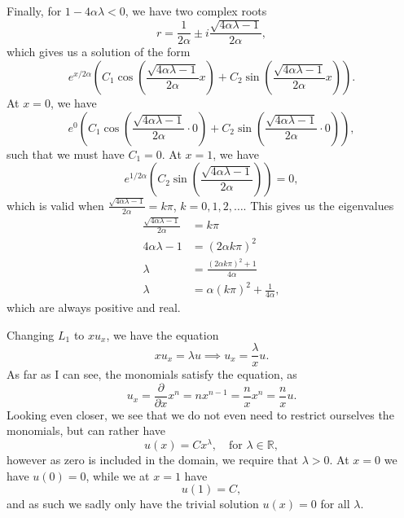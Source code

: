 \begin{solution}{5.6}
    Finally, for $1 - 4 \alpha \lambda < 0$, we have two complex roots
    \begin{equation}
        r = \frac{1}{2\alpha} \pm i \frac{\sqrt{4 \alpha \lambda - 1}}{2\alpha},
    \end{equation}
    which gives us a solution of the form
    \begin{equation}
        e^{x / 2\alpha} \left(
            C_1 \cos\left(\frac{\sqrt{4 \alpha \lambda - 1}}{2\alpha} x\right)
            + C_2 \sin\left(\frac{\sqrt{4 \alpha \lambda - 1}}{2\alpha} x\right)
        \right).
    \end{equation}
    At $x = 0$, we have
    \begin{equation}
        e^{0} \left(
            C_1 \cos\left(\frac{\sqrt{4 \alpha \lambda - 1}}{2\alpha} \cdot 0 \right)
            + C_2 \sin\left(\frac{\sqrt{4 \alpha \lambda - 1}}{2\alpha} \cdot 0 \right)
        \right),
    \end{equation}
    such that we must have $C_1 = 0$.
    At $x = 1$, we have
    \begin{equation}
        e^{1 / 2\alpha} \left( C_2 \sin\left(\frac{\sqrt{4 \alpha \lambda - 1}}{2\alpha}\right) \right) = 0,
    \end{equation}
    which is valid when $\frac{\sqrt{4 \alpha \lambda - 1}}{2\alpha} = k \pi$, $k = 0, 1, 2, \ldots$.
    This gives us the eigenvalues
    \begin{align*}
        \frac{\sqrt{4 \alpha \lambda - 1}}{2\alpha} &= k \pi \\
        4 \alpha \lambda - 1 &= (2\alpha k \pi)^2 \\
        \lambda &= \frac{(2 \alpha k \pi)^2 + 1}{4 \alpha} \\
        \lambda &= \alpha (k \pi)^2 + \frac{1}{4 \alpha},
    \end{align*}
    which are always positive and real.

    Changing $L_1$ to $x u_x$, we have the equation
    \begin{equation}
        x u_x = \lambda u \implies u_x = \frac{\lambda}{x} u.
    \end{equation}
    As far as I can see, the monomials satisfy the equation, as
    \begin{equation}
        u_x = \frac{\partial}{\partial x} x^n = n x^{n - 1} = \frac{n}{x} x^n = \frac{n}{x} u.
    \end{equation}
    Looking even closer, we see that we do not even need to restrict ourselves the monomials, but can rather have
    \begin{equation}
        u(x) = C x^\lambda,
        \quad \text{for }
        \lambda \in \mathbb{R},
    \end{equation}
    however as zero is included in the domain, we require that $\lambda > 0$.
    At $x = 0$ we have $u(0) = 0$, while we at $x = 1$ have
    \begin{equation}
        u(1) = C,
    \end{equation}
    and as such we sadly only have the trivial solution $u(x) = 0$ for all $\lambda$.


\end{solution}
